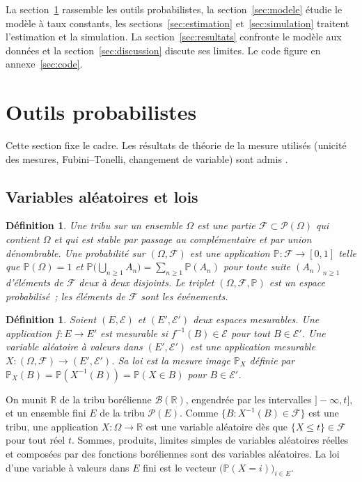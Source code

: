 \documentclass[10pt,a4paper,twocolumn]{article}
\theoremstyle{enonce}
\theoremstyle{defi}
\newtheorem{definition}[theoreme]{Définition}
\newcommand{\PP}{\mathbb{P}}
\begin{document}
La section~\ref{sec:outils} rassemble les outils probabilistes, la section~\ref{sec:modele} étudie le modèle à taux constants, les sections~\ref{sec:estimation} et~\ref{sec:simulation} traitent l'estimation et la simulation. La section~\ref{sec:resultats} confronte le modèle aux données et la section~\ref{sec:discussion} discute ses limites. Le code figure en annexe~\ref{sec:code}.

\section{Outils probabilistes}\label{sec:outils}

Cette section fixe le cadre. Les résultats de théorie de la mesure utilisés (unicité des mesures, Fubini--Tonelli, changement de variable) sont admis \cite{JP04}.

\subsection{Variables aléatoires et lois}

\begin{definition}
Une \emph{tribu} sur un ensemble $\Omega$ est une partie $\mathcal{F}\subset\mathcal{P}(\Omega)$ qui contient $\Omega$ et qui est stable par passage au complémentaire et par union dénombrable. Une \emph{probabilité} sur $(\Omega,\mathcal{F})$ est une application $\PP:\mathcal{F}\to[0,1]$ telle que $\PP(\Omega)=1$ et $\PP\big(\bigcup_{n\geq1}A_n\big)=\sum_{n\geq1}\PP(A_n)$ pour toute suite $(A_n)_{n\geq1}$ d'éléments de $\mathcal{F}$ deux à deux disjoints. Le triplet $(\Omega,\mathcal{F},\PP)$ est un \emph{espace probabilisé}~; les éléments de $\mathcal{F}$ sont les \emph{événements}.
\end{definition}

\begin{definition}
Soient $(E,\mathcal{E})$ et $(E',\mathcal{E}')$ deux espaces mesurables. Une application $f:E\to E'$ est \emph{mesurable} si $f^{-1}(B)\in\mathcal{E}$ pour tout $B\in\mathcal{E}'$. Une \emph{variable aléatoire} à valeurs dans $(E',\mathcal{E}')$ est une application mesurable $X:(\Omega,\mathcal{F})\to(E',\mathcal{E}')$. Sa \emph{loi} est la mesure image $\PP_X$ définie par $\PP_X(B)=\PP(X^{-1}(B))=\PP(X\in B)$ pour $B\in\mathcal{E}'$.
\end{definition}

On munit $\mathbb{R}$ de la tribu borélienne $\mathcal{B}(\mathbb{R})$, engendrée par les intervalles $]-\infty,t]$, et un ensemble fini $E$ de la tribu $\mathcal{P}(E)$. Comme $\{B:X^{-1}(B)\in\mathcal{F}\}$ est une tribu, une application $X:\Omega\to\mathbb{R}$ est une variable aléatoire dès que $\{X\leq t\}\in\mathcal{F}$ pour tout réel $t$. Sommes, produits, limites simples de variables aléatoires réelles et composées par des fonctions boréliennes sont des variables aléatoires. La loi d'une variable à valeurs dans $E$ fini est le vecteur $\big(\PP(X=i)\big)_{i\in E}$.
\end{document}

